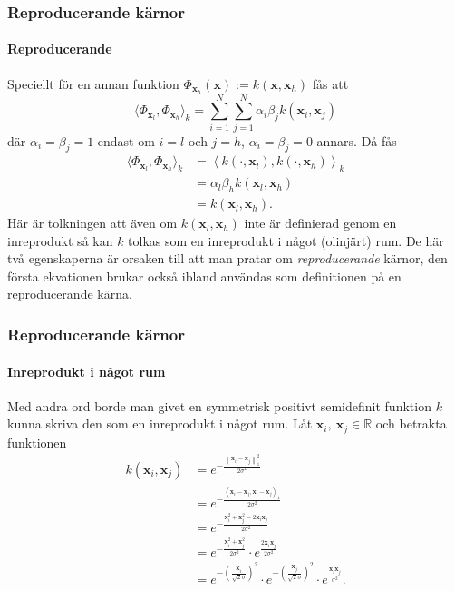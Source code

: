 \documentclass{beamer}
\theoremstyle{definition}
\theoremstyle{remark}
\newcommand{\bfx}{\mathbf{x}}
\newcommand{\llangle}{\left\langle}
\newcommand{\rrangle}{\right\rangle}
\newcommand{\inner}[2]{\llangle #1, #2 \rrangle}
\begin{document}
\begin{frame}
\frametitle{Reproducerande kärnor}
\framesubtitle{Reproducerande}
Speciellt för en annan funktion $\Phi_{\bfx_h}(\bfx):=k\left(\bfx, \bfx_h\right)$ fås att
\begin{equation*}
\langle \Phi_{\bfx_l}, \Phi_{\bfx_h} \rangle_k = \sum_{i=1}^{N}\sum_{j=1}^{N}\alpha_i\beta_jk\left(\bfx_i, \bfx_j\right)
\end{equation*}
där $\alpha_i=\beta_j=1$ endast om $i=l$ och $j=h$, $\alpha_i=\beta_j=0$ annars. Då fås
\begin{equation*}\label{eq:reproducing2}
\begin{aligned}
\langle \Phi_{\bfx_l}, \Phi_{\bfx_h} \rangle_k &= \inner{k\left(\cdot, \bfx_l\right)}{k\left(\cdot, \bfx_h\right)}_k\\ &= \alpha_l\beta_hk\left(\bfx_l, \bfx_h\right)\\&= k\left(\bfx_l, \bfx_h\right).
\end{aligned}
\end{equation*}
Här är tolkningen att även om $k\left(\bfx_l, \bfx_h\right)$ inte är definierad genom en inreprodukt så kan $k$ tolkas som en inreprodukt i något (olinjärt) rum. De här två egenskaperna är orsaken till att man pratar om \emph{reproducerande} kärnor, den första ekvationen brukar också ibland användas som definitionen på en reproducerande kärna.
\end{frame}

\begin{frame}
\frametitle{Reproducerande kärnor}
\framesubtitle{Inreprodukt i något rum}
Med andra ord borde man givet en symmetrisk positivt semidefinit funktion $k$ kunna skriva den som en inreprodukt i något rum.
	Låt $\bfx_i,~\bfx_j\in\mathbb{R}$ och betrakta funktionen
\begin{align*}
k\left(\bfx_i, \bfx_j\right)&=e^{-\frac{\left\| \bfx_i-\bfx_j\right\|_1^2}{2\sigma^2}}\\&=e^{-\frac{\inner{\bfx_i-\bfx_j}{\bfx_i-\bfx_j}_1}{2\sigma^2}}\\
&=e^{-\frac{\bfx_i^2+\bfx_j^2-2\bfx_i\bfx_j}{2\sigma^2}}\\&=e^{-\frac{\bfx_i^2+\bfx_j^2}{2\sigma^2}}\cdot e^{\frac{2\bfx_i\bfx_j}{2\sigma^2}}\\
&= e^{-\left(\frac{\bfx_i}{\sqrt{2}\sigma}\right)^2}\cdot e^{-\left(\frac{\bfx_j}{\sqrt{2}\sigma}\right)^2}\cdot e^{\frac{\bfx_i\bfx_j}{\sigma^2}}.
\end{align*}

\end{frame}
\end{document}
